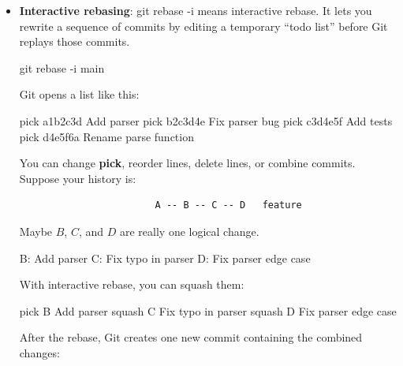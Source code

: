 \documentclass{report}
\begin{document}
\begin{itemize}
\begin{itemize}
\begin{bashcode}
                        git restore --theirs file.cpp
                    \end{bashcode}
                \item \textbf{Interactive rebasing}: git rebase -i means interactive rebase. It lets you rewrite a sequence of commits by editing a temporary “todo list” before Git replays those commits.
                    \bigbreak \noindent 
                    \begin{bashcode}
                        git rebase -i main
                    \end{bashcode}
                    \bigbreak \noindent 
                    Git opens a list like this:
                    \bigbreak \noindent 
                    \begin{bashcode}
                        pick a1b2c3d Add parser
                        pick b2c3d4e Fix parser bug
                        pick c3d4e5f Add tests
                        pick d4e5f6a Rename parse function
                    \end{bashcode}
                    \bigbreak \noindent 
                    You can change \textbf{pick}, reorder lines, delete lines, or combine commits.
                    \bigbreak \noindent 
                    Suppose your history is:
                    \bigbreak \noindent 
                    \begin{verbatim}
                        A -- B -- C -- D   feature 
                    \end{verbatim}
                    \bigbreak \noindent 
                    Maybe $B$, $C$, and $D$ are really one logical change.
                    \bigbreak \noindent 
                    \begin{bashcode}
                        B: Add parser
                        C: Fix typo in parser
                        D: Fix parser edge case
                    \end{bashcode}
                    \bigbreak \noindent 
                    With interactive rebase, you can squash them:
                    \bigbreak \noindent 
                    \begin{bashcode}
                        pick B Add parser
                        squash C Fix typo in parser
                        squash D Fix parser edge case
                    \end{bashcode}
                    \bigbreak \noindent 
                    After the rebase, Git creates one new commit containing the combined changes:
                    \bigbreak \noindent 

\end{itemize}
\end{itemize}
\end{document}
